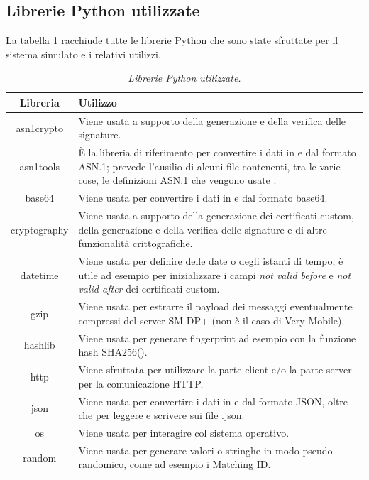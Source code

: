 \documentclass[10pt, oneside]{book}
\begin{document}
\subsection{Librerie Python utilizzate}
La tabella \ref{tab:libraries} racchiude tutte le librerie Python che sono state sfruttate per il sistema simulato e i relativi utilizzi.\\
\begin{table}[h!]
\begin{center}
\captionsetup{skip=4pt}
\caption{\textit{Librerie Python utilizzate.}}
\label{tab:libraries}
\begin{tabularx}{\textwidth}{|c|X|}
\hline
\textbf{Libreria} & \textbf{Utilizzo}\\
\hline
asn1crypto & Viene usata a supporto della generazione e della verifica delle signature.\\
\hline
asn1tools & È la libreria di riferimento per convertire i dati in e dal formato ASN.1; prevede l'ausilio di alcuni file contenenti, tra le varie cose, le definizioni ASN.1 che vengono usate \cite{RSP-definitions}.\\
\hline
base64 & Viene usata per convertire i dati in e dal formato base64.\\
\hline
cryptography & Viene usata a supporto della generazione dei certificati custom, della generazione e della verifica delle signature e di altre funzionalità crittografiche.\\
\hline
datetime & Viene usata per definire delle date o degli istanti di tempo; è utile ad esempio per inizializzare i campi \textit{not valid before} e \textit{not valid after} dei certificati custom.\\
\hline
gzip & Viene usata per estrarre il payload dei messaggi eventualmente compressi del server SM-DP+ (non è il caso di Very Mobile).\\
\hline
hashlib & Viene usata per generare fingerprint ad esempio con la funzione hash SHA256().\\
\hline
http & Viene sfruttata per utilizzare la parte client e/o la parte server per la comunicazione HTTP.\\
\hline
json & Viene usata per convertire i dati in e dal formato JSON, oltre che per leggere e scrivere sui file .json.\\
\hline
os & Viene usata per interagire col sistema operativo.\\
\hline
random & Viene usata per generare valori o stringhe in modo pseudo-randomico, come ad esempio i Matching ID.\\

\end{tabularx}
\end{center}
\end{table}
\end{document}
